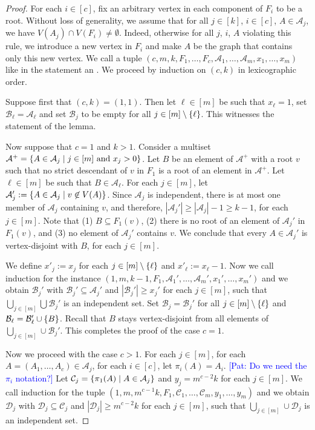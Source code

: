 \documentclass{patmorin}
\newcommand{\pat}[1]{\textcolor{Blue}{[Pat: #1]}}
\DeclarePairedDelimiter\set{\{}{\}}
\begin{document}
\begin{proof}
For each $i\in[c]$, fix an arbitrary vertex in each component of $F_i$ to be a root. 
Without loss of generality, 
we assume that for all $j\in[k]$, $i\in[c]$, $A\in\mathcal{A}_j$, 
we have $V(A_j)\cap V(F_i)\neq\emptyset$. 
Indeed, otherwise for all $j$, $i$, $A$ violating this rule, we introduce a new vertex in $F_i$ and make $A$ be the graph that contains only this new vertex.
We call a tuple $(c,m,k,F_1,\ldots,F_c,\mathcal{A}_1,\ldots,\mathcal{A}_m,x_1,\ldots,x_m)$ like in the statement an .
We proceed by induction on $(c,k)$ in lexicographic order. 

Suppose first that $(c,k)=(1,1)$. 
Then let $\ell\in[m]$ be such that $x_\ell=1$,
set $\mathcal{B}_{\ell}=\mathcal{A}_{\ell}$ and set $\mathcal{B}_j$ to be empty for all $j\in[m]\setminus\set{\ell}$.
This witnesses the statement of the lemma.

Now suppose that $c=1$ and $k>1$.
Consider a multiset $\mathcal{A}^+=\set{A\in \mathcal{A}_j\mid j\in[m] \textrm{ and $x_j>0$}}$. 
Let $B$ be an element of $\mathcal{A}^+$ with a root $v$ such that no strict descendant of $v$ in $F_1$ is a root of an element in $\mathcal{A}^+$.
Let $\ell\in[m]$ be such that $B\in\mathcal{A}_{\ell}$.
For each $j\in[m]$, 
let $\mathcal{A}_j':=\set{A\in\mathcal{A}_j\mid v\not\in V(A)}$. 
Since $\mathcal{A}_j$ is independent, there is at most one member of $\mathcal{A}_j$ containing $v$, 
and therefore, $|\mathcal{A}_j'|\geq |\mathcal{A}_j|-1\geq k-1$, for each $j\in[m]$. 
Note that 
(1) $B\subseteq F_1(v)$,
(2) there is no root of an element of  $\mathcal{A}_j'$ in $F_1(v)$, and 
(3) no element of $\mathcal{A}_j'$ contains $v$. 
We conclude that every $A\in\mathcal{A}_j'$ is vertex-disjoint with $B$, for each $j\in[m]$.

We define 
$x'_j:=x_j$ for each $j\in[m]\setminus\set{\ell}$ and $x'_\ell:=x_{\ell}-1$. 
Now we call induction for the instance 
$(1,m,k-1,F_1,\mathcal{A}_1',\ldots,\mathcal{A}_m',x_1',\ldots,x_m')$ and 
we obtain $\mathcal{B}_j'$ with 
$\mathcal{B}_j'\subseteq \mathcal{A}_j'$ and $|\mathcal{B}_j'|\geq x_j'$ for each $j\in [m]$, 
such that $\bigcup_{j\in[m]}\bigcup\mathcal{B}_j'$ is an independent set.
Set $\mathcal{B}_j=\mathcal{B}_j'$ for all $j\in[m]\setminus\set{\ell}$ and $\mathcal{B}_\ell=\mathcal{B}_\ell'\cup\set{B}$.
Recall that $B$ stays vertex-disjoint from all elements of $\bigcup_{j\in[m]}\cup\mathcal{B}_j'$.  
This completes the proof of the case $c=1$.

Now we proceed with the case $c>1$. 
For each $j\in[m]$, 
for each $A=(A_1,\ldots,A_c)\in \mathcal{A}_j$, 
for each $i\in[c]$, 
let $\pi_i(A)=A_i$. %
\pat{Do we need the $\pi_i$ notation?}
Let $\mathcal{C}_j=\set{\pi_1(A)\mid A\in\mathcal{A}_j}$ and
$y_j=m^{c-2}k$ for each $j\in[m]$. 
We call induction for the tuple 
$(1,m,m^{c-1}k,F_1,\mathcal{C}_1,\ldots,\mathcal{C}_m,y_1,\ldots,y_m)$ and 
we obtain $\mathcal{D}_j$ with 
$\mathcal{D}_j\subseteq \mathcal{C}_j$ and $|\mathcal{D}_j|\geq m^{c-2}k$ for each $j\in [m]$, 
such that $\bigcup_{j\in[m]}\cup\mathcal{D}_j$ is an independent set.


\end{proof}
\end{document}
